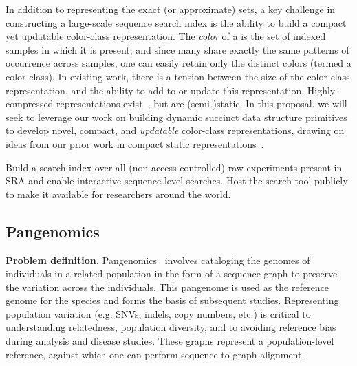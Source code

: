 In addition to representing the exact (or approximate) \kmer sets, a key challenge in constructing a large-scale sequence search index is the ability to build a compact yet updatable color-class representation. The \emph{color} of a \kmer is the set of indexed samples in which it is present, and
since many \kmers share exactly the same patterns of occurrence across samples, one can easily retain only the distinct colors (termed a color-class).  In existing work, there is a tension between the size of the color-class representation, and the ability to add to or update this representation. Highly-compressed representations exist~\cite{Karasikov2020,Pibiri2023MacDBG,AlmodaresiPFJP19}, but are (semi-)static.  In this proposal, we will seek to leverage our work on building dynamic succinct data structure primitives to develop novel, compact, and \emph{updatable} color-class representations, drawing on ideas from our prior work in compact static representations~\cite{AlmodaresiPFJP19,Pibiri2023MacDBG}.

\begin{rproblem}
Build a search index over all (non access-controlled) raw experiments present in SRA and enable interactive sequence-level searches. Host the search tool publicly to make it available for researchers around the world.
\label{rprob:seq-search}
\end{rproblem}

\subsection{Pangenomics}
\label{subsec:pangenomics}

\textbf{Problem definition.}
Pangenomics~\cite{sherman2020pan} involves cataloging the genomes of individuals in a related population in the form of a sequence graph to preserve the variation across the individuals. This pangenome is used as the reference genome for the species and forms the basis of subsequent studies. Representing population variation (e.g. SNVs, indels, copy numbers, etc.) is critical to understanding relatedness, population diversity, and to avoiding reference bias during analysis and disease studies. These graphs represent a population-level reference, against which one can perform sequence-to-graph alignment. 

